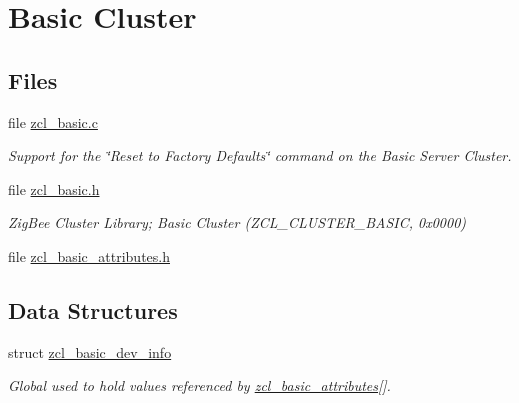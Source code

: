 \hypertarget{group__zcl__basic}{\section{Basic Cluster}
\label{group__zcl__basic}
}
\subsection*{Files}
\begin{DoxyCompactItemize}
\item 
file \hyperlink{zcl__basic_8c}{zcl\-\_\-basic.\-c}
\begin{DoxyCompactList}\small\item\em Support for the \char`\"{}\-Reset to Factory Defaults\char`\"{} command on the Basic Server Cluster. \end{DoxyCompactList}\item 
file \hyperlink{zcl__basic_8h}{zcl\-\_\-basic.\-h}
\begin{DoxyCompactList}\small\item\em Zig\-Bee Cluster Library; Basic Cluster (Z\-C\-L\-\_\-\-C\-L\-U\-S\-T\-E\-R\-\_\-\-B\-A\-S\-I\-C, 0x0000) \end{DoxyCompactList}\item 
file \hyperlink{zcl__basic__attributes_8h}{zcl\-\_\-basic\-\_\-attributes.\-h}
\end{DoxyCompactItemize}
\subsection*{Data Structures}
\begin{DoxyCompactItemize}
\item 
struct \hyperlink{structzcl__basic__dev__info}{zcl\-\_\-basic\-\_\-dev\-\_\-info}
\begin{DoxyCompactList}\small\item\em Global used to hold values referenced by \hyperlink{group__zcl__basic_ga721ebe2f6ae346632475cf178671d150}{zcl\-\_\-basic\-\_\-attributes}\mbox{[}\mbox{]}. \end{DoxyCompactList}\end{DoxyCompactItemize}
